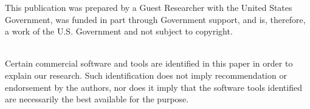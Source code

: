This publication was prepared by a Guest Researcher with the United States Government, was funded in part through Government support, and is, therefore, a work of the U.S. Government and not subject to copyright.

\noindent
\\
Certain commercial software and tools are identified in this paper in order to explain our research. Such identification does not imply recommendation or endorsement by the authors, nor does it imply that the software tools identified are necessarily the best available for the purpose.